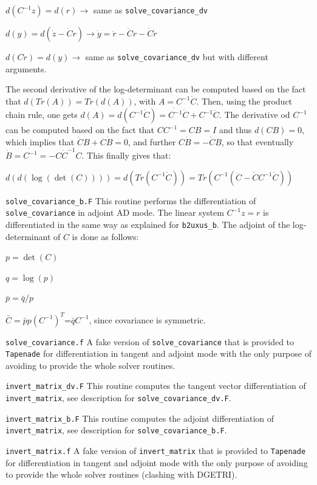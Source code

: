 \begin{description}
  $d(C^{-1}z)=d(r) \rightarrow $ same as {\tt solve\_covariance\_dv}

  $d(y)=d(\dot{z}-\dot{C}r) \rightarrow \dot{y} = \ddot{r} - \ddot{C}r - \dot{C}\dot{r}$

  $d(C\dot{r})=d(y) \rightarrow $ same as {\tt solve\_covariance\_dv} but with different arguments.

  The second derivative of the log-determinant can be computed based on the fact that $d(Tr(A)) = Tr(d(A))$, with $A=C^{-1}\dot{C}$. Then, using the product chain rule, one gets $d(A)=d(C^{-1}\dot{C})=\dot{C^{-1}}\dot{C}+C^{-1}\ddot{C}$. The derivative od $C^{-1}$ can be computed based on the fact that $CC^{-1}=CB=I$ and thus $d(CB)=0$, which implies that $\dot{C}B+C\dot{B}=0$, and further $C\dot{B}=-\dot{C}B$, so that eventually $\dot{B}=\dot{C^{-1}}=-C\dot{C}^{-1}C$. This finally gives that:

  $d(d(\log(\det(C))))=d(Tr(C^{-1}\dot{C})) = Tr(C^{-1}(\ddot{C}-\dot{C}C^{-1}\dot{C}))$

  \item {\tt solve\_covariance\_b.F} This routine performs the differentiation of {\tt solve\_covariance} in adjoint AD mode. The linear system $C^{-1}z=r$ is differentiated in the same way as explained for {\tt b2uxus\_b}. The adjoint of the log-determinant of $C$ is done as follows:

  $p=\det(C)$

  $q=\log(p)$

  $\bar{p} = \bar{q}/p$

  $\bar{C}=\bar{p}p(C^{-1})^T$=$\bar{q}C^{-1}$, since covariance is symmetric.

  \item {\tt solve\_covariance.f} A fake version of {\tt solve\_covariance} that is provided to {\tt Tapenade} for differentiation in tangent and adjoint mode with the only purpose of avoiding to provide the whole solver routines.

  \item {\tt invert\_matrix\_dv.F} This routine computes the tangent vector differentiation of {\tt invert\_matrix}, see description for {\tt solve\_covariance\_dv.F}.

  \item {\tt invert\_matrix\_b.F} This routine computes the adjoint differentiation of {\tt invert\_matrix}, see description for {\tt solve\_covariance\_b.F}.

  \item {\tt invert\_matrix.f} A fake version of {\tt invert\_matrix} that is provided to {\tt Tapenade} for differentiation in tangent and adjoint mode with the only purpose of avoiding to provide the whole solver routines (clashing with DGETRI).
\end{description}

